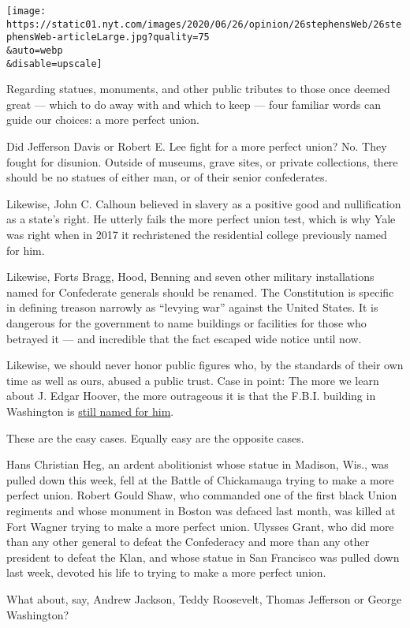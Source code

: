 \texttt{[image: https://static01.nyt.com/images/2020/06/26/opinion/26stephensWeb/26stephensWeb-articleLarge.jpg?quality=75\\\&auto=webp\\\&disable=upscale]}

Regarding statues, monuments, and other public tributes to those once
deemed great --- which to do away with and which to keep --- four
familiar words can guide our choices: a more perfect union.

Did Jefferson Davis or Robert E. Lee fight for a more perfect union? No.
They fought for disunion. Outside of museums, grave sites, or private
collections, there should be no statues of either man, or of their
senior confederates.

Likewise, John C. Calhoun believed in slavery as a positive good and
nullification as a state's right. He utterly fails the more perfect
union test, which is why Yale was right when in 2017 it rechristened the
residential college previously named for him.

Likewise, Forts Bragg, Hood, Benning and seven other military
installations named for Confederate generals should be renamed. The
Constitution is specific in defining treason narrowly as ``levying war''
against the United States. It is dangerous for the government to name
buildings or facilities for those who betrayed it --- and incredible
that the fact escaped wide notice until now.

Likewise, we should never honor public figures who, by the standards of
their own time as well as ours, abused a public trust. Case in point:
The more we learn about J. Edgar Hoover, the more outrageous it is that
the F.B.I. building in Washington is
\href{https://www.wsj.com/articles/SB112182505647390371}{still named for
him}.

These are the easy cases. Equally easy are the opposite cases.

Hans Christian Heg, an ardent abolitionist whose statue in Madison,
Wis., was pulled down this week, fell at the Battle of Chickamauga
trying to make a more perfect union. Robert Gould Shaw, who commanded
one of the first black Union regiments and whose monument in Boston was
defaced last month, was killed at Fort Wagner trying to make a more
perfect union. Ulysses Grant, who did more than any other general to
defeat the Confederacy and more than any other president to defeat the
Klan, and whose statue in San Francisco was pulled down last week,
devoted his life to trying to make a more perfect union.

What about, say, Andrew Jackson, Teddy Roosevelt, Thomas Jefferson or
George Washington?

